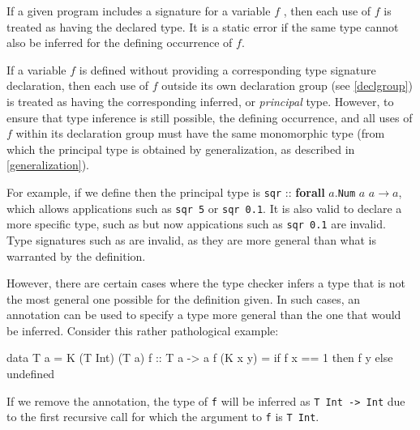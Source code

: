 If a given program includes a signature for a variable $f$ , then each use of $f$ is treated as having the declared type.
It is a static error if the same type cannot also be inferred for the defining occurrence of $f$.

If a variable $f$ is defined without providing a corresponding type signature declaration, then each use of $f$ outside its own declaration group (see \autoref{declgroup}) is treated as having the corresponding inferred, or \emph{principal} type.
However, to ensure that type inference is still possible, the defining occurrence, and all uses of $f$ within its declaration group must have the same monomorphic type (from which the principal type is obtained by generalization, as described in \autoref{generalization}).

For example, if we define 
then the principal type is \texttt{sqr} :: \textbf{forall} $a$.\texttt{Num} $a$ \sym{=>} $a \rightarrow{} a$, which allows applications such as \texttt{sqr 5} or \texttt{sqr 0.1}.
It is also valid to declare a more specific type, such as  but now appications such as \texttt{sqr 0.1} are invalid. Type signatures such as  are invalid, as they are more general than what is warranted by the definition.

However, there are certain cases where the type checker infers a type that is not the most general one possible for the definition given. In such cases, an annotation can be used to specify a type more general than the one that would be inferred. Consider this rather pathological example:
\begin{code}
data T a = K (T Int) (T a)
f :: T a -> a
f (K x y) = if f x == 1 then f y else undefined
\end{code}
If we remove the annotation, the type of \texttt{f} will be inferred as \texttt{T Int -> Int} due to the first recursive call for which the argument to \texttt{f} is \texttt{T Int}.

